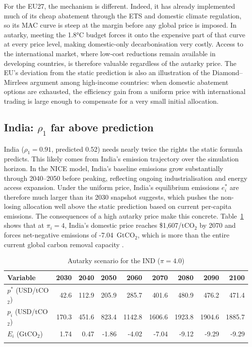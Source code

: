 \documentclass[12pt,english]{article}
\begin{document}
For the EU27, the mechanism is different. Indeed, it has already implemented much of its cheap abatement through the ETS and domestic climate regulation, so its MAC curve is steep at the margin before any global price is imposed. In autarky, meeting the 1.8°C budget forces it onto the expensive part of that curve at every price level, making domestic-only decarbonisation very costly. Access to the international market, where low-cost reductions remain available in developing countries, is therefore valuable regardless of the autarky price. The EU's deviation from the static prediction is also an illustration of the Diamond--Mirrlees argument among high-income countries: when domestic abatement options are exhausted, the efficiency gain from a uniform price with international trading is large enough to compensate for a very small initial allocation.

\subsection{India: $\rho_1$ far above prediction}

India ($\rho_1 = 0.91$, predicted 0.52) needs nearly twice the rights the static formula predicts. This likely comes from India's emission trajectory over the simulation horizon. In the NICE model, India's baseline emissions grow substantially through 2040--2050 before peaking, reflecting ongoing industrialisation and energy access expansion. Under the uniform price, India's equilibrium emissions $e^*_i$ are therefore much larger than its 2030 snapshot suggests, which pushes the non-losing allocation well above the static prediction based on current per-capita emissions. The consequences of a high autarky price make this concrete. Table~\ref{tab:autarky_ind} shows that at $\pi_i = 4$, India's domestic price reaches \$1,607/tCO$_2$ by 2070 and forces net-negative emissions of
-7.04~GtCO$_2$, which is more than the entire current global carbon removal capacity \citep{cdr2026}. 

\begin{table}[h]
\centering
\caption{Autarky scenario for the IND ($\pi=4.0$)}
\renewcommand{\arraystretch}{1.2}
\begin{tabular}{lrrrrrrrr}
  \toprule
  \textbf{Variable} & \textbf{2030} & \textbf{2040} & \textbf{2050} & \textbf{2060} & \textbf{2070} & \textbf{2080} & \textbf{2090} & \textbf{2100} \\
  \midrule
  $p^*$ (USD/tCO$_2$) & 42.6 & 112.9 & 205.9 & 285.7 & 401.6 & 480.9 & 476.2 & 471.4 \\
  $p_i$ (USD/tCO$_2$) & 170.3 & 451.6 & 823.4 & 1142.8 & 1606.6 & 1923.8 & 1904.6 & 1885.7 \\
  $E_i$ (GtCO$_2$) & 1.74 & 0.47 & -1.86 & -4.02 & -7.04 & -9.12 & -9.29 & -9.29 \\
  \bottomrule
  \label{tab:autarky_ind}
\end{tabular}
\end{table}
\end{document}
